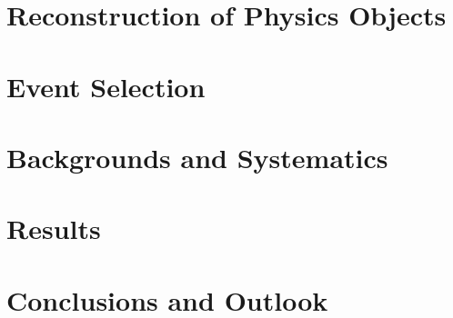 \documentclass{brandeis-dissertation}
\begin{document}
\chapter{Reconstruction of Physics Objects}
\label{sec:TrackingIso}

\clearpage
\chapter{Event Selection}
\label{sec:EventSelection}

\clearpage
\chapter{Backgrounds and Systematics}
\label{sec:BackgroundsSys}

\clearpage
\chapter{Results}
\label{sec:Results}

\clearpage
%

\clearpage
\chapter{Conclusions and Outlook}
\label{sec:conclusion}

\end{document}
